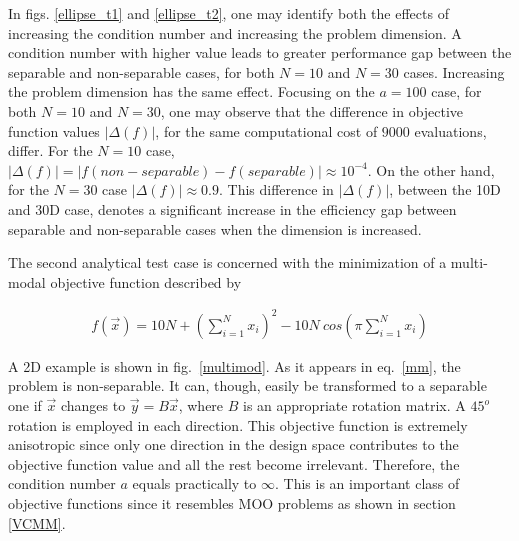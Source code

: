 In figs. \ref{ellipse_t1} and \ref{ellipse_t2}, one may identify both the effects of increasing the condition number and increasing the problem dimension. A condition number with higher value leads to greater performance gap between the separable and non-separable cases, for both $N\!=\!10$ and $N\!=\!30$ cases. Increasing the problem dimension has the same effect. Focusing on the $a\!=\!100$ case, for both $N\!=\!10$ and $N\!=\!30$, one may observe that the difference in objective function values $|\Delta(f)|$, for the same computational cost of $9000$ evaluations, differ. For the $N\!=\!10$ case, $|\Delta(f)|\!=\!|f(non-separable)\!-\!f(separable)| \approx  10^{-4}$. On the other hand, for the $N=30$ case $|\Delta(f)| \approx  0.9$. This difference in $|\Delta(f)|$, between the 10D and 30D case, denotes a significant increase in the efficiency gap between separable and non-separable cases when the dimension is increased.      

The second analytical test case is concerned with the minimization of a multi-modal objective function described by  

\begin{eqnarray}
   f(\vec{x})=10N+(\sum^{N}_{i=1}x_i)^2 - 10N~ cos(\pi  \sum^{N}_{i=1}x_i)
   \label{mm} 
\end{eqnarray}

A 2D example is shown in fig.\ \ref{multimod}. As it appears in eq.\ \ref{mm}, the problem is non-separable. It can, though, easily be transformed to a separable one if $\vec{x}$ changes to $\vec{y}=B\vec{x}$, where $B$ is an appropriate rotation matrix.  A $45^o$ rotation is employed in each direction.  This objective function is extremely anisotropic since only one direction in the design space contributes to the objective function value and all the rest become irrelevant. Therefore, the condition number $a$ equals practically to $\infty$. This is an important class of objective functions since it resembles MOO problems as shown in section \ref{VCMM}.    

